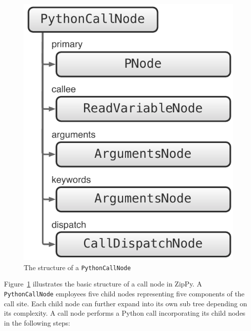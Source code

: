 \begin{figure}
\centering
\includegraphics[scale=.5]{figures/ch5-python-call-node-basic}
\caption{The structure of a \texttt{PythonCallNode}}
\label{fig:ch5-python-call-node-basic}
\end{figure}

Figure~\ref{fig:ch5-python-call-node-basic} illustrates the basic structure of a call node in ZipPy.
A \texttt{PythonCallNode} employees five child nodes representing five components of the call site.
Each child node can further expand into its own sub tree depending on its complexity.
A call node performs a Python call incorporating its child nodes in the following steps:

